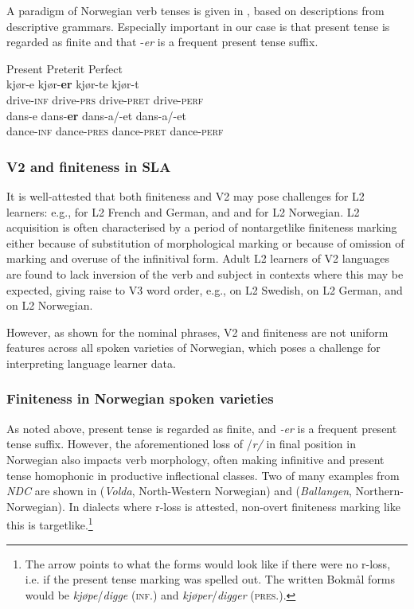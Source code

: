 \documentclass[output=paper,colorlinks,citecolor=brown,modfonts,nonflat]{../langscibook}
\begin{document}
A paradigm of Norwegian verb tenses is given in , based on descriptions from descriptive grammars. Especially important in our case is that present tense is regarded as finite and that -\textit{er} is a frequent present tense suffix.  


\ea%
    \label{ex:emilsen:10}
 {Present} {Preterit} {Perfect}  \\
 kjør-e kjør-\textbf{er} kjør-te kjør-t  \\
 drive-\textsc{inf}  drive-\textsc{prs}  drive-\textsc{pret} drive-\textsc{perf}  \\
  dans-e dans-\textbf{er} dans-a/-et dans-a/-et  \\
 dance-\textsc{inf}  dance-\textsc{pres}  dance-\textsc{pret} dance-\textsc{perf}  \\
\z

\subsubsection{V2 and finiteness in SLA}%

It is well-attested that both finiteness and V2 may pose challenges for L2 learners: e.g., \citet{PrévostWhite2000} for L2 French and German, and \citet{Hagen2001, Hagen2005, Mosfjeld2017} and \citet{GujordEtAl2018} for L2 Norwegian. L2 acquisition is often characterised by a period of nontargetlike finiteness marking either because of substitution of morphological marking or because of omission of marking and overuse of the infinitival form. Adult L2 learners of V2 languages are found to lack inversion of the verb and subject in contexts where this may be expected, giving raise to V3 word order, e.g., \citet{Bohnacker2010} on L2 Swedish, \citet{Bohnacker2006} on L2 German, and \citet{Mosfjeld2017} on L2 Norwegian. 

However, as shown for the nominal phrases, V2 and finiteness are not uniform features across all spoken varieties of Norwegian, which poses a challenge for interpreting language learner data. 

\subsubsection{Finiteness in Norwegian spoken varieties}%

As noted above, present tense is regarded as finite, and \textit{{}-er} is a frequent present tense suffix. However, the aforementioned loss of /\textit{r/} in final position in Norwegian also impacts verb morphology, often making infinitive and present tense homophonic in productive inflectional classes. Two of many examples from \textit{NDC} are shown in  (\textit{Volda}, North-Western Norwegian) and  (\textit{Ballangen}, North\-ern-Norwegian). In dialects where r-loss is attested, non-overt finiteness marking like this is targetlike.\footnote{{The arrow points to what the forms would look like if there were no r-loss, i.e. if the present tense marking was spelled out. The written Bokmål forms would be} {\textit{kjøpe}}{/}{\textit{digge}} {(\textsc{inf}.) and} {\textit{kjøper}}{/}{\textit{digger}} {(\textsc{pres}.).}}
\end{document}

